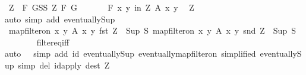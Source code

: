 \begin{isabellebody}
\ {\isacharquery}{\kern0pt}Z\ {\isacharequal}{\kern0pt}\ {\isachardoublequoteopen}{\isasymSqunion}{\isacharparenleft}{\kern0pt}F{\isacharcomma}{\kern0pt}\ G{\isacharparenright}{\kern0pt}{\isasymin}SS{\isacharprime}{\kern0pt}{\isachardot}{\kern0pt}\ Z\ F\ G{\isachardoublequoteclose}\isanewline
\ \ \ \ \isamarkupfalse%
\ {\isacharasterisk}{\kern0pt}{\isacharcolon}{\kern0pt}\ {\isachardoublequoteopen}{\isasymforall}\isactrlsub F\ {\isacharparenleft}{\kern0pt}x{\isacharcomma}{\kern0pt}\ y{\isacharparenright}{\kern0pt}\ in\ {\isacharquery}{\kern0pt}Z{\isachardot}{\kern0pt}\ A\ x\ y{\isachardoublequoteclose}\ \isamarkupfalse%
\ Z\ \isamarkupfalse%
{\isacharparenleft}{\kern0pt}auto\ simp\ add{\isacharcolon}{\kern0pt}\ eventually{\isacharunderscore}{\kern0pt}Sup{\isacharparenright}{\kern0pt}\isanewline
\ \ \ \ \isamarkupfalse%
\ {\isachardoublequoteopen}map{\isacharunderscore}{\kern0pt}filter{\isacharunderscore}{\kern0pt}on\ {\isacharbraceleft}{\kern0pt}{\isacharparenleft}{\kern0pt}x{\isacharcomma}{\kern0pt}\ y{\isacharparenright}{\kern0pt}{\isachardot}{\kern0pt}\ A\ x\ y{\isacharbraceright}{\kern0pt}\ fst\ {\isacharquery}{\kern0pt}Z\ {\isacharequal}{\kern0pt}\ Sup\ S{\isachardoublequoteclose}\ {\isachardoublequoteopen}map{\isacharunderscore}{\kern0pt}filter{\isacharunderscore}{\kern0pt}on\ {\isacharbraceleft}{\kern0pt}{\isacharparenleft}{\kern0pt}x{\isacharcomma}{\kern0pt}\ y{\isacharparenright}{\kern0pt}{\isachardot}{\kern0pt}\ A\ x\ y{\isacharbraceright}{\kern0pt}\ snd\ {\isacharquery}{\kern0pt}Z\ {\isacharequal}{\kern0pt}\ Sup\ S{\isacharprime}{\kern0pt}{\isachardoublequoteclose}\isanewline
\ \ \ \ \ \ \isamarkupfalse%
\ filter{\isacharunderscore}{\kern0pt}eq{\isacharunderscore}{\kern0pt}iff\isanewline
\ \ \ \ \ \ \isamarkupfalse%
{\isacharparenleft}{\kern0pt}auto\ {}\ {}\ simp\ add{\isacharcolon}{\kern0pt}\ id\ eventually{\isacharunderscore}{\kern0pt}Sup\ eventually{\isacharunderscore}{\kern0pt}map{\isacharunderscore}{\kern0pt}filter{\isacharunderscore}{\kern0pt}on\ {\isacharasterisk}{\kern0pt}{\isacharbrackleft}{\kern0pt}simplified\ eventually{\isacharunderscore}{\kern0pt}Sup{\isacharbrackright}{\kern0pt}\ simp\ del{\isacharcolon}{\kern0pt}\ id{\isacharunderscore}{\kern0pt}apply\ dest{\isacharcolon}{\kern0pt}\ Z{\isacharparenright}{\kern0pt}\isanewline
\ \ \isamarkupfalse%
\isanewline
{}\isamarkupfalse%
%
\endisatagproof
{\isafoldproof}%
%
\isadelimproof
\isanewline
%
\endisadelimproof
\isanewline
{}\isamarkupfalse%

\end{isabellebody}

